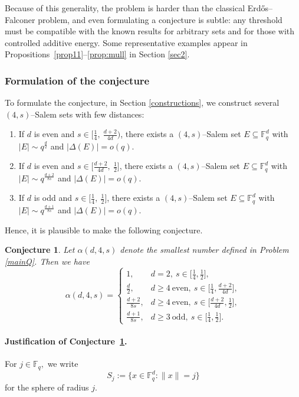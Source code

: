 \documentclass[11pt]{article}
\newtheorem{conjecture}[theorem]{Conjecture}
\def\F{\mathbb{F}}
\begin{document}
Because of this generality, the problem is harder than the classical Erd\H{o}s–Falconer problem, and even formulating a conjecture is subtle: any threshold must be compatible with the known results for arbitrary sets and for those with controlled additive energy. Some representative examples appear in Propositions~\ref{prop11}--\ref{prop:mull} in Section \ref{sec2}.

\subsubsection*{Formulation of the conjecture} To formulate the conjecture, in Section \ref{constructions}, we construct several $(4, s)$--Salem sets with few distances:
\begin{enumerate}
\item If $d$ is even and $s\in\big[\tfrac14,\ \tfrac{d+2}{4d}\big)$, there exists a $(4,s)$--Salem set $E\subseteq\F_q^d$ with $|E|\sim q^{\frac{d}{2}}$ and $|\Delta(E)|=o(q)$.
\item If $d$ is even and $s\in\big[\tfrac{d+2}{4d},\ \tfrac12\big]$, there exists a $(4,s)$--Salem set $E\subseteq\F_q^d$ with $|E|\sim q^{\frac{d+2}{8s}}$ and $|\Delta(E)|=o(q)$.
\item If $d$ is odd and $s\in\big[\tfrac14,\ \tfrac12\big]$, there exists a $(4,s)$--Salem set $E\subseteq\F_q^d$ with $|E|\sim q^{\frac{d+1}{8s}}$ and $|\Delta(E)|=o(q)$.
\end{enumerate}

Hence, it is plausible to make the following conjecture.
\begin{conjecture}\label{conj}  Let $\alpha(d,4,s)$ denote the smallest number defined in Problem \ref{mainQ}. Then we have
\[
\alpha(d,4,s)=
\begin{cases}
1,& d=2,\ s\in\big[\tfrac14,\tfrac12\big],\\[3pt]
\frac{d}{2}, & d\ge4\ \text{even},\ s\in\big[\tfrac14,\tfrac{d+2}{4d}\big],\\[3pt]
\frac{d+2}{8s}, & d\ge4\ \text{even},\ s\in\big[\tfrac{d+2}{4d},\tfrac12\big],\\[3pt]
\frac{d+1}{8s}, & d\ge3\ \text{odd},\ s\in\big[\tfrac14,\tfrac12\big].
\end{cases}
\]
\end{conjecture}


\paragraph{Justification of Conjecture~\ref{conj}.}
For $j \in \mathbb F_q,$ we write
\[
S_j := \{x \in \mathbb F_q^d : \|x\| = j\}
\]
for the sphere of radius $j$.
\end{document}
